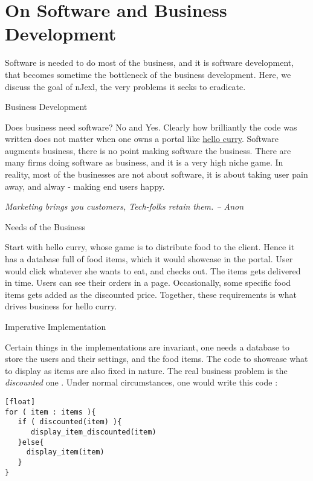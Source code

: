 \chapter{On Software and Business Development}\label{intro}

{\LARGE S}oftware is needed to do most of the business, and it is software development, that becomes sometime the bottleneck 
of the business development. Here, we discuss the goal of nJexl, the very problems it seeks to eradicate.


\begin{section}{Business Development}\label{buisness-development-defined}

Does business need software? No and Yes. 
Clearly how brilliantly the code was written does not matter when one owns a portal like \href{www.hellocurry.com}{hello curry}.
Software augments business, there is no point making software the business. There are many firms doing software as business, and it is a very high niche game. In reality, most of the businesses are not about software, it is about taking user pain away, and alway - making end users happy. 

\emph{Marketing brings you customers, Tech-folks retain them. -- Anon}


\begin{subsection}{Needs of the Business}\label{business-need}

Start with hello curry, whose game is to distribute food to the client. Hence it has a database full of food items, which it would showcase in the portal. User would click whatever she wants to eat, and checks out. The items gets delivered in time. Users can see their orders in a page. Occasionally, some specific food items gets added as the discounted price. Together, these requirements is what drives business for hello curry.

\end{subsection}

\begin{subsection}{Imperative Implementation}\label{imperative-impl}

Certain things in the implementations are invariant,  one needs a database to store the users and their settings, and the food items. The code to showcase what to display as items are also fixed in nature. The real business problem is the \emph{discounted} one . Under normal circumstances, one would write this code :

\begin{lstlisting}[style=JexlStyle][float]
for ( item : items ){
   if ( discounted(item) ){
      display_item_discounted(item)
   }else{
     display_item(item)
   }
}
\end{lstlisting}


\end{subsection}
\end{section}
